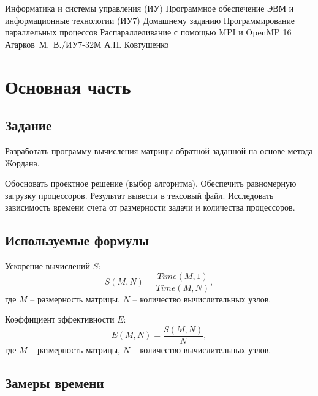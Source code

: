 \documentclass{bmstu}
\begin{document}
\makereporttitle
{Информатика и системы управления (ИУ)}
{Программное обеспечение ЭВМ и информационные технологии (ИУ7)}
{Домашнему заданию}
{Программирование параллельных процессов}
{Распараллеливание с помощью MPI и OpenMP}
{16}
{Агарков~М.~В./ИУ7-32М}
{А.П. Ковтушенко}

\setcounter{page}{2}
\renewcommand{\contentsname}{Содержание} 
\tableofcontents

\chapter{Основная часть}

\section{Задание}

Разработать программу вычисления матрицы обратной заданной на основе метода Жордана.

Обосновать проектное решение (выбор алгоритма).
Обеспечить равномерную загрузку процессоров.
Результат вывести в тексовый файл.
Исследовать зависимость времени счета от размерности задачи и количества процессоров.

\section{Используемые формулы}


Ускорение вычислений $S$:
\begin{equation}
    \label{eq:eq_s}
    S(M, N) = \frac{\mathit{Time}(M, 1)}{\mathit{Time}(M, N)},
\end{equation}
где $M$ -- размерность матрицы, $N$ -- количество вычислительных узлов.

Коэффициент эффективности $E$:
\begin{equation}
    \label{eq:eq_e}
    E(M, N) = \frac{S(M, N)}{N},
\end{equation}
где $M$ -- размерность матрицы, $N$ -- количество вычислительных узлов.


\section{Замеры времени}
\end{document}
